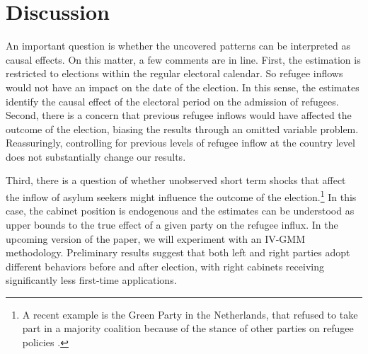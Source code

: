 \documentclass[a4paper,12pt]{article}
\begin{document}
\section{Discussion}\label{sec:discussion}
An important question is whether the uncovered patterns can be interpreted as causal effects. On this matter, a few comments are in line. First, the estimation is restricted to elections within the regular electoral calendar. So refugee inflows would not have an impact on the date of the election. In this sense, the estimates identify the causal effect of the electoral period on the admission of refugees. Second, there is a concern that previous refugee inflows would have affected the outcome of the election, biasing the results through an omitted variable problem. Reassuringly, controlling for previous levels of refugee inflow at the country level does not substantially change our results.
% 
% 

Third, there is a question of whether unobserved short term shocks that affect the inflow of asylum seekers might influence the outcome of the election.\footnote{A recent example is the Green Party in the Netherlands, that refused to take part in a majority coalition because of the stance of other parties on refugee policies \textit{\citep{Economist2017}}.} In this case, the cabinet position is endogenous and the estimates can be understood as upper bounds to the true effect of a given party on the refugee influx. In the upcoming version of the paper, we will experiment with an IV-GMM methodology. Preliminary results suggest that both left and right parties adopt different behaviors before and after election, with right cabinets receiving significantly less first-time applications.
% 
% 
\end{document}
